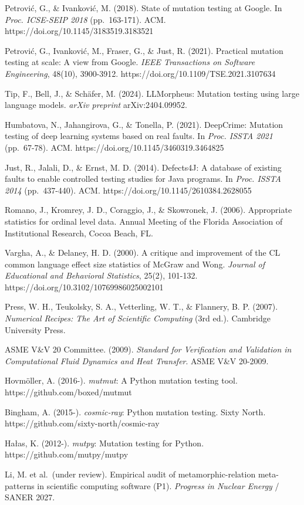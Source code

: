 \documentclass[review,12pt,authoryear]{elsarticle}
\begin{document}
Petrović, G., \& Ivanković, M. (2018). State of mutation testing at
Google. In \emph{Proc. ICSE-SEIP 2018} (pp.~163-171). ACM.
https://doi.org/10.1145/3183519.3183521

Petrović, G., Ivanković, M., Fraser, G., \& Just, R. (2021). Practical
mutation testing at scale: A view from Google. \emph{IEEE Transactions
on Software Engineering}, 48(10), 3900-3912.
https://doi.org/10.1109/TSE.2021.3107634

Tip, F., Bell, J., \& Schäfer, M. (2024). LLMorpheus: Mutation testing
using large language models. \emph{arXiv preprint} arXiv:2404.09952.

Humbatova, N., Jahangirova, G., \& Tonella, P. (2021). DeepCrime:
Mutation testing of deep learning systems based on real faults. In
\emph{Proc. ISSTA 2021} (pp.~67-78). ACM.
https://doi.org/10.1145/3460319.3464825

Just, R., Jalali, D., \& Ernst, M. D. (2014). Defects4J: A database of
existing faults to enable controlled testing studies for Java programs.
In \emph{Proc. ISSTA 2014} (pp.~437-440). ACM.
https://doi.org/10.1145/2610384.2628055

Romano, J., Kromrey, J. D., Coraggio, J., \& Skowronek, J. (2006).
Appropriate statistics for ordinal level data. Annual Meeting of the
Florida Association of Institutional Research, Cocoa Beach, FL.

Vargha, A., \& Delaney, H. D. (2000). A critique and improvement of the
CL common language effect size statistics of McGraw and Wong.
\emph{Journal of Educational and Behavioral Statistics}, 25(2), 101-132.
https://doi.org/10.3102/10769986025002101

Press, W. H., Teukolsky, S. A., Vetterling, W. T., \& Flannery, B. P.
(2007). \emph{Numerical Recipes: The Art of Scientific Computing} (3rd
ed.). Cambridge University Press.

ASME V\&V 20 Committee. (2009). \emph{Standard for Verification and
Validation in Computational Fluid Dynamics and Heat Transfer}. ASME V\&V
20-2009.

Hovmöller, A. (2016-). \emph{mutmut}: A Python mutation testing tool.
https://github.com/boxed/mutmut

Bingham, A. (2015-). \emph{cosmic-ray}: Python mutation testing. Sixty
North. https://github.com/sixty-north/cosmic-ray

Hałas, K. (2012-). \emph{mutpy}: Mutation testing for Python.
https://github.com/mutpy/mutpy

Li, M. et al.~(under review). Empirical audit of metamorphic-relation
meta-patterns in scientific computing software (P1). \emph{Progress in
Nuclear Energy} / SANER 2027.
\end{document}

